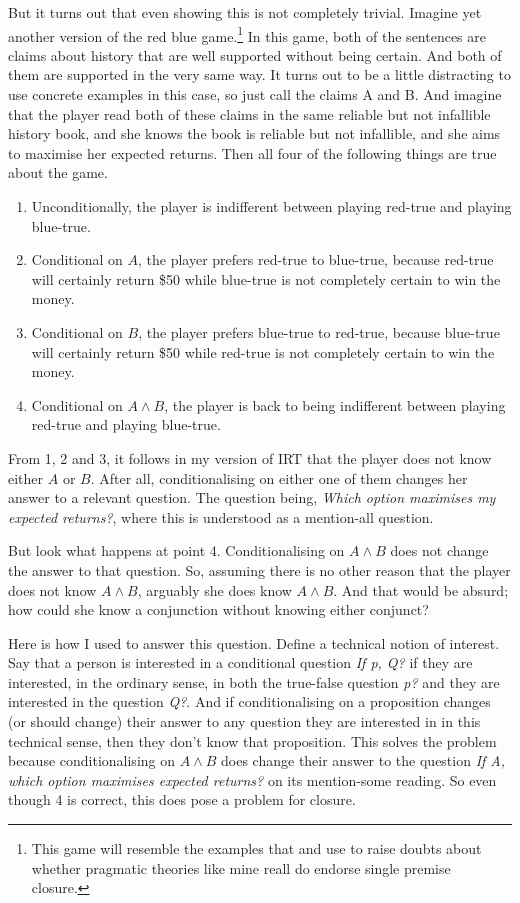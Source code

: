 \documentclass[11pt,]{book}
\providecommand{\tightlist}{%
  \setlength{\itemsep}{0pt}\setlength{\parskip}{0pt}}
\let\rmarkdownfootnote\footnote%
\def\footnote{\protect\rmarkdownfootnote}
\begin{document}
But it turns out that even showing this is not completely trivial. Imagine yet another version of the red blue game.\footnote{This game will resemble the examples that \citet{Zweber2016} and \citet{AndersonHawthorne2019b} use to raise doubts about whether pragmatic theories like mine reall do endorse single premise closure.} In this game, both of the sentences are claims about history that are well supported without being certain. And both of them are supported in the very same way. It turns out to be a little distracting to use concrete examples in this case, so just call the claims A and B. And imagine that the player read both of these claims in the same reliable but not infallible history book, and she knows the book is reliable but not infallible, and she aims to maximise her expected returns. Then all four of the following things are true about the game.

\begin{enumerate}
\def\labelenumi{\arabic{enumi}.}
\tightlist
\item
  Unconditionally, the player is indifferent between playing red-true and playing blue-true.
\item
  Conditional on \(A\), the player prefers red-true to blue-true, because red-true will certainly return \$50 while blue-true is not completely certain to win the money.
\item
  Conditional on \(B\), the player prefers blue-true to red-true, because blue-true will certainly return \$50 while red-true is not completely certain to win the money.
\item
  Conditional on \(A \wedge B\), the player is back to being indifferent between playing red-true and playing blue-true.
\end{enumerate}

From 1, 2 and 3, it follows in my version of IRT that the player does not know either \(A\) or \(B\). After all, conditionalising on either one of them changes her answer to a relevant question. The question being, \emph{Which option maximises my expected returns?}, where this is understood as a mention-all question.

But look what happens at point 4. Conditionalising on \(A \wedge B\) does not change the answer to that question. So, assuming there is no other reason that the player does not know \(A \wedge B\), arguably she does know \(A \wedge B\). And that would be absurd; how could she know a conjunction without knowing either conjunct?

Here is how I used to answer this question. Define a technical notion of interest. Say that a person is interested in a conditional question \emph{If p, Q?} if they are interested, in the ordinary sense, in both the true-false question \emph{p?} and they are interested in the question \emph{Q?}. And if conditionalising on a proposition changes (or should change) their answer to any question they are interested in in this technical sense, then they don't know that proposition. This solves the problem because conditionalising on \(A \wedge B\) does change their answer to the question \emph{If A, which option maximises expected returns?} on its mention-some reading. So even though 4 is correct, this does pose a problem for closure.
\end{document}
